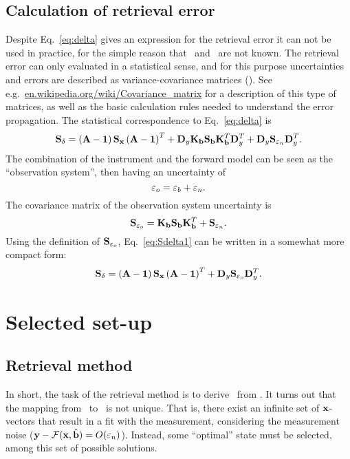 \subsection{Calculation of retrieval error}
%
Despite Eq.~\ref{eq:delta} gives an expression for the retrieval error it can
not be used in practice, for the simple reason that \SttVct\ and \FrwMdlVct\
are not known. The retrieval error can only evaluated in a statistical sense,
and for this purpose uncertainties and errors are described as
variance-covariance matrices (\CvrMtr). See e.g.\
\url{en.wikipedia.org/wiki/Covariance_matrix} for a description of this type of
matrices, as well as the basic calculation rules needed to understand the error
propagation. The statistical correspondence to Eq.~\ref{eq:delta} is
\begin{equation}
  \label{eq:Sdelta1}
  \mathbf{S}_{\delta} = \left(\mathbf{A}-\mathbf{1}\right)\mathbf{S}_{\mathbf{x}}
  \left(\mathbf{A}-\mathbf{1}\right)^T + 
  \mathbf{D}_{y}\mathbf{K}_{\mathbf{b}}\mathbf{S}_{\mathbf{b}}
  \mathbf{K}_{\mathbf{b}}^T\mathbf{D}_{y}^T + 
  \mathbf{D}_{y}\mathbf{S}_{\varepsilon_n}\mathbf{D}_{y}^T.
\end{equation}
The combination of the instrument and the forward model can be seen as
the ``observation system'', then having an uncertainty of
\begin{equation}
  \label{eq:eps_o}
  \varepsilon_o = \varepsilon_b + \varepsilon_n. 
\end{equation}
The covariance matrix of the observation system uncertainty is 
\begin{equation}
  \label{eq:So}
  \mathbf{S}_{\varepsilon_o} = \mathbf{K}_{\mathbf{b}}\mathbf{S}_{\mathbf{b}}
  \mathbf{K}_{\mathbf{b}}^T + \mathbf{S}_{\varepsilon_n}.
\end{equation}
Using the definition of $\mathbf{S}_{\varepsilon_o}$, Eq.~\ref{eq:Sdelta1}
can be written in a somewhat more compact form:
\begin{equation}
  \label{eq:Sdelta2}
  \mathbf{S}_{\delta} = \left(\mathbf{A}-\mathbf{1}\right)\mathbf{S}_{\mathbf{x}}
  \left(\mathbf{A}-\mathbf{1}\right)^T + \mathbf{D}_{y}\mathbf{S}_{\varepsilon_o}\mathbf{D}_{y}^T.
\end{equation}




\section{Selected set-up}
\label{sec:setup}

\subsection{Retrieval method}
\label{sec:setup:inverse}
%
In short, the task of the retrieval method is to derive \RtrVct\ from \MsrVct.
It turns out that the mapping from \MsrVct\ to \RtrVct\ is not unique. That is,
there exist an infinite set of $\mathbf{x}$-vectors that result in a fit with the
measurement, considering the measurement noise
($\mathbf{y}-\mathcal{F}(\mathbf{x},\hat{\mathbf{b}})=O(\varepsilon_n)$\todo{Is this correct
  nomenclature?}). Instead, some ``optimal'' state must be selected, among this
set of possible solutions.

